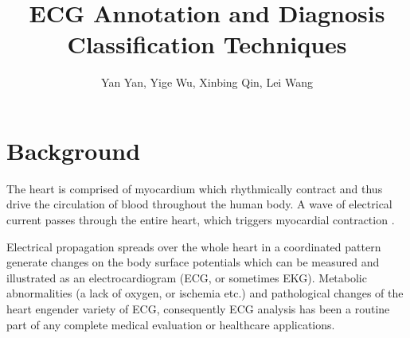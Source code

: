 \documentclass[graybox]{svmult}
\begin{document}
\title*{ECG Annotation and Diagnosis Classification Techniques}
\author{Yan Yan, Yige Wu, Xinbing Qin, Lei Wang}
%
%




\maketitle
{}



\section{Background}
The heart is comprised of myocardium which rhythmically contract and thus drive the circulation of blood throughout the human body.
A wave of electrical current passes through the entire heart, which triggers myocardial contraction \cite{clifford2006advanced}.

Electrical propagation spreads over the whole heart in a coordinated pattern generate changes on the body surface potentials which can be measured and illustrated as an electrocardiogram (ECG, or sometimes EKG).
Metabolic abnormalities (a lack of oxygen, or ischemia etc.) and pathological changes of the heart engender variety of ECG, consequently ECG analysis has been a routine part of any complete medical evaluation or healthcare applications.
\end{document}
